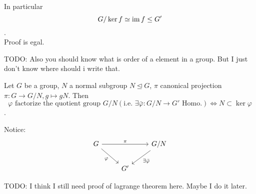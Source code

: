 In particular $$G/\ker f \simeq \operatorname{im} f \leq G' $$.\\

Proof is egal.

TODO: Also you should know what is order of a element in a group. But I just don't know where should i write that.

\begin{theorem}
    Let $G$ be a group, $N$ a normal subgroup $N\unlhd G$, $\pi$ canonical projection $\pi: G \to G/N, g \mapsto gN.$ Then $$ \varphi \text{ factorize the quotient group } G/N(\text{i.e. }\exists \bar{\varphi} : G/N \to G' \text{ Homo.}) \Leftrightarrow N \subset \ker \varphi$$.
\end{theorem}
Notice:\[%
\begin{tikzcd}
G \arrow[rr, "\pi"] \arrow[rd, "\varphi"'] &    & G/N \arrow[ld, "\exists \bar{\varphi}"] \\
                                           & G' &                                        
\end{tikzcd}\]

TODO: I think I still need proof of lagrange theorem here. Maybe I do it later.